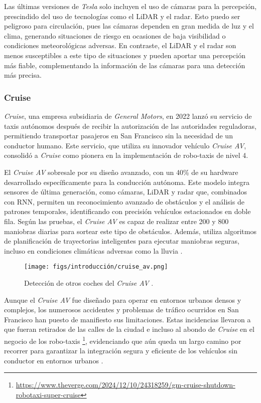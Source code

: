 Las últimas versiones de \textit{Tesla} solo incluyen el uso de cámaras para la percepción, prescindido del uso de tecnologías como el \ac{LiDAR} y el radar. Esto puedo ser peligroso para circulación, pues las cámaras dependen en gran medida de luz y el clima, generando situaciones de riesgo en ocasiones de baja visibilidad o condiciones meteorológicas adversas. En contraste, el \ac{LiDAR} y el radar son menos susceptibles a este tipo de situaciones y pueden aportar una percepción más fiable, complementando la información de las cámaras para una detección más precisa.

\subsubsection{Cruise}

\textit{Cruise}, una empresa subsidiaria de \textit{General Motors}, en 2022 lanzó su servicio de taxis autónomos después de recibir la autorización de las autoridades reguladoras, permitiendo transportar pasajeros en San Francisco sin la necesidad de un conductor humano. Este servicio, que utiliza su innovador vehículo \textit{Cruise AV}, consolidó a \textit{Cruise} como pionera en la implementación de robo-taxis de nivel 4. 

El \textit{Cruise AV} sobresale por su diseño avanzado, con un 40\% de su hardware desarrollado específicamente para la conducción autónoma. Este modelo integra sensores de última generación, como cámaras, \ac{LiDAR} y radar que, combinados con \ac{RNN}, permiten un reconocimiento avanzado de obstáculos y el análisis de patrones temporales, identificando con precisión vehículos estacionados en doble fila. Según las pruebas, el \textit{Cruise AV} es capaz de realizar entre 200 y 800 maniobras diarias para sortear este tipo de obstáculos. Además, utiliza algoritmos de planificación de trayectorias inteligentes para ejecutar maniobras seguras, incluso en condiciones climáticas adversas como la lluvia \cite{cruise}.

\begin{figure}[ht]
\begin{center}
\texttt{[image: figs/introducción/cruise\_av.png]}
\end{center}
\caption{Detección de otros coches del \textit{Cruise AV} \cite{cruise-video}.}
\label{cruise}
\end{figure}

\newpage

Aunque el \textit{Cruise AV} fue diseñado para operar en entornos urbanos densos y complejos, los numerosos accidentes y problemas de tráfico ocurridos en San Francisco han puesto de manifiesto sus limitaciones. Estas incidencias llevaron a que fueran retirados de las calles de la ciudad e incluso al abondo de \textit{Cruise} en el negocio de los robo-taxis \footnote{\url {https://www.theverge.com/2024/12/10/24318259/gm-cruise-shutdown-robotaxi-super-cruise}}, evidenciando que aún queda un largo camino por recorrer para garantizar la integración segura y eficiente de los vehículos sin conductor en entornos urbanos \cite{robotaxis-cruise}.

